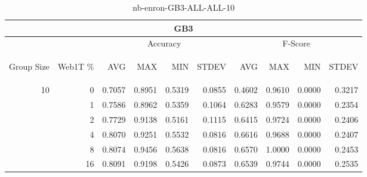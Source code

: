 \begin{center}
\begin{table}[htbp]
\begin{tabular}{ | r | r | r | r | r | r | r | r | r | r |}
\hline
\multicolumn{10}{|c|}{GB3}\\
\hline
 & & \multicolumn{4}{|c|}{Accuracy} & \multicolumn{4}{|c|}{F-Score}\\ \cline{3-10}
\begin{sideways}Group Size\end{sideways} & \begin{sideways}Web1T \%\end{sideways} & \begin{sideways}AVG\end{sideways} & \begin{sideways}MAX\end{sideways} & \begin{sideways}MIN\end{sideways} & \begin{sideways}STDEV\end{sideways} & \begin{sideways}AVG\end{sideways} & \begin{sideways}MAX\end{sideways} & \begin{sideways}MIN\end{sideways} & \begin{sideways}STDEV\end{sideways}\\
\hline
\multirow{6}{*}{10}
 & 0 & 0.7057 & 0.8951 & 0.5319 & 0.0855 & 0.4602 & 0.9610 & 0.0000 & 0.3217\\ \cline{2-10}
 & 1 & 0.7586 & 0.8962 & 0.5359 & 0.1064 & 0.6283 & 0.9579 & 0.0000 & 0.2354\\ \cline{2-10}
 & 2 & 0.7729 & 0.9138 & 0.5161 & 0.1115 & 0.6415 & 0.9724 & 0.0000 & 0.2406\\ \cline{2-10}
 & 4 & 0.8070 & 0.9251 & 0.5532 & 0.0816 & 0.6616 & 0.9688 & 0.0000 & 0.2407\\ \cline{2-10}
 & 8 & 0.8074 & 0.9456 & 0.5638 & 0.0816 & 0.6570 & 1.0000 & 0.0000 & 0.2453\\ \cline{2-10}
 & 16 & 0.8091 & 0.9198 & 0.5426 & 0.0873 & 0.6539 & 0.9744 & 0.0000 & 0.2535\\ \cline{2-10}
\hline
\end{tabular}
\caption{nb-enron-GB3-ALL-ALL-10}
\end{table}
\end{center}

